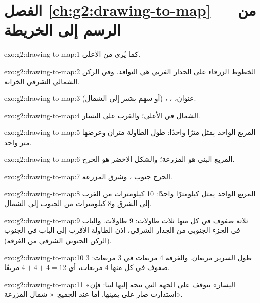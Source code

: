 \section*{الفصل \ref{ch:g2:drawing-to-map} --- من الرسم إلى الخريطة}

\begin{solution}{exo:g2:drawing-to-map:1}
كما يُرى من الأعلى.
\end{solution}

\begin{solution}{exo:g2:drawing-to-map:2}
الخطوط الزرقاء على الجدار الغربي هي النوافذ. وفي الركن الشمالي الشرقي
الخزانة.
\end{solution}

\begin{solution}{exo:g2:drawing-to-map:3}
عنوان، ، ،  (أو سهم يشير إلى الشمال).
\end{solution}

\begin{solution}{exo:g2:drawing-to-map:4}
الشمال في الأعلى؛ والغرب على اليسار.
\end{solution}

\begin{solution}{exo:g2:drawing-to-map:5}
المربع الواحد يمثل مترًا واحدًا: طول الطاولة متران وعرضها متر واحد.
\end{solution}

\begin{solution}{exo:g2:drawing-to-map:6}
المربع البني هو المزرعة؛ والشكل الأخضر هو الحرج.
\end{solution}

\begin{solution}{exo:g2:drawing-to-map:7}
الحرج جنوب ، وشرق المزرعة.
\end{solution}

\begin{solution}{exo:g2:drawing-to-map:8}
المربع الواحد يمثل كيلومترًا واحدًا: 10 كيلومترات من الغرب إلى الشرق و8
كيلومترات من الجنوب إلى الشمال.
\end{solution}

\begin{solution}{exo:g2:drawing-to-map:9}
ثلاثة صفوف في كل منها ثلاث طاولات: 9 طاولات. والباب في الجزء الجنوبي من
الجدار الشرقي، إذن الطاولة الأقرب إلى الباب في الجنوب (الركن الجنوبي
الشرقي من الغرفة).
\end{solution}

\begin{solution}{exo:g2:drawing-to-map:10}
طول السرير مربعان. والغرفة 4 مربعات في 3 مربعات: 3 صفوف في كل منها 4
مربعات، أي $4 + 4 + 4 = 12$ مربعًا.
\end{solution}

\begin{solution}{exo:g2:drawing-to-map:11}
«اليسار» يتوقف على الجهة التي تتجه إليها لينا: فإن استدارت صار  على
يمينها. أما عند الجميع: « شمال المزرعة».
\end{solution}
